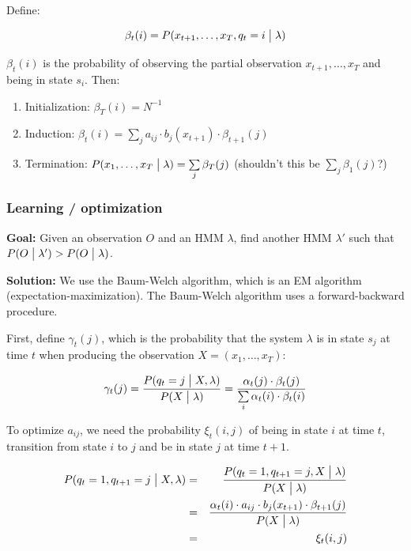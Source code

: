 \documentclass[11pt]{article}
\begin{document}
Define:

\begin{equation}
    \beta_t(i) = P(x_{t+1}, \ldots, x_T, q_t = i \bigm| \lambda)
\end{equation}

\vspace{10pt}

$\beta_t(i)$ is the probability of observing the partial observation $x_{t+1}, \ldots, x_T$ and being in state $s_i$. Then:

\begin{enumerate}
    \item Initialization: $\beta_T(i) = N^{-1}$
    \item Induction: $\beta_t(i) = \sum\limits_j a_{ij} \cdot b_j(x_{t+1}) \cdot \beta_{t+1}(j)$
    \item Termination: $P(x_1, \ldots, x_T \bigm| \lambda) = \sum\limits_j \beta_T(j)$ (shouldn't this be $\sum\limits_j \beta_1(j)$?)
\end{enumerate}

\subsubsection{Learning / optimization}

\textbf{Goal:} Given an observation $O$ and an HMM $\lambda$, find another HMM $\lambda'$ such that $P(O \bigm| \lambda') > P(O \bigm| \lambda)$.

\textbf{Solution:} We use the Baum-Welch algorithm, which is an EM algorithm (expectation-maximization). The Baum-Welch algorithm uses a forward-backward procedure.

First, define $\gamma_t(j)$, which is the probability that the system $\lambda$ is in state $s_j$ at time $t$ when producing the observation $X = (x_1, \ldots, x_T)$:

\begin{equation}
    \gamma_t(j) = \frac{P(q_t = j \bigm| X, \lambda)}{P(X \bigm| \lambda)} = \frac{\alpha_t(j) \cdot \beta_t(j)}{\sum\limits_i \alpha_t(i) \cdot \beta_t(i)}
\end{equation}

To optimize $a_{ij}$, we need the probability $\xi_t(i, j)$ of being in state $i$ at time $t$, transition from state $i$ to $j$ and be in state $j$ at time $t+1$.

\begin{eqnarray*}
    P(q_t = 1, q_{t+1} = j \bigm| X, \lambda) &=& \frac{P(q_t = 1, q_{t+1} = j, X \bigm| \lambda)}{P(X \bigm| \lambda)} \\
                                              &=& \frac{\alpha_t(i) \cdot a_{ij} \cdot b_j(x_{t+1}) \cdot \beta_{t+1}(j)}{P(X \bigm| \lambda)} \\
                                              &=& \xi_t(i, j)
\end{eqnarray*}
\end{document}
